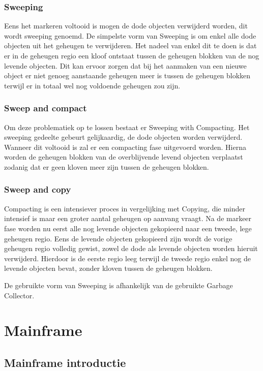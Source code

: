\subsubsection{Sweeping}
Eens het markeren voltooid is mogen de dode objecten verwijderd worden, dit wordt sweeping genoemd.
De simpelste vorm van Sweeping is om enkel alle dode objecten uit het geheugen te verwijderen.
Het nadeel van enkel dit te doen is dat er in de geheugen regio een kloof ontstaat tussen de geheugen blokken van de nog levende objecten.
Dit kan ervoor zorgen dat bij het aanmaken van een nieuwe object er niet genoeg aanstaande geheugen meer is tussen de geheugen blokken terwijl er in totaal wel nog voldoende geheugen zou zijn.
\subsubsection{Sweep and compact}
Om deze problematiek op te lossen bestaat er Sweeping with Compacting.
Het sweeping gedeelte gebeurt gelijkaardig, de dode objecten worden verwijderd.
Wanneer dit voltooid is zal er een compacting fase uitgevoerd worden.
Hierna worden de geheugen blokken van de overblijvende levend objecten verplaatst zodanig dat er geen kloven meer zijn tussen de geheugen blokken.
\subsubsection{Sweep and copy}
Compacting is een intensiever proces in vergelijking met Copying, die minder intensief is maar een groter aantal geheugen op aanvang vraagt.
Na de markeer fase worden nu eerst alle nog levende objecten gekopieerd naar een tweede, lege geheugen regio.
Eens de levende objecten gekopieerd zijn wordt de vorige geheugen regio volledig gewist, zowel de dode als levende objecten worden hieruit verwijderd.
Hierdoor is de eerste regio leeg terwijl de tweede regio enkel nog de levende objecten bevat, zonder kloven tussen de geheugen blokken.

De gebruikte vorm van Sweeping is afhankelijk van de gebruikte Garbage Collector.
\autocite{Putten2022}


\section{Mainframe}
\label{sec:mainframe}
\subsection{Mainframe introductie}
\label{sec:mainframe introductie}

